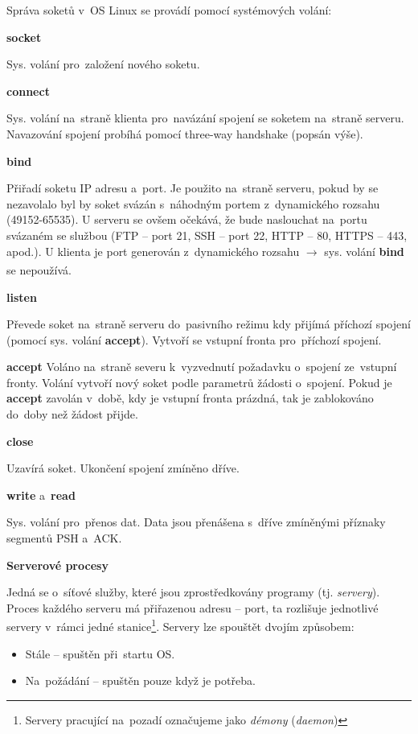 Správa soketů v~OS Linux se provádí pomocí systémových volání:

\vspace{0,5cm}
\textbf{socket}

Sys. volání pro~založení nového soketu.

\vspace{0,5cm}
\textbf{connect}

Sys. volání na~straně klienta pro~navázání spojení se soketem na~straně serveru. Navazování spojení probíhá pomocí three-way handshake (popsán výše).

\vspace{0,5cm}
\textbf{bind}

Přiřadí soketu IP adresu a~port. Je použito na~straně serveru, pokud by se nezavolalo byl by soket svázán s~náhodným portem z~dynamického rozsahu (49152-65535). U serveru se ovšem očekává, že bude naslouchat na~portu svázaném se službou (FTP -- port 21, SSH -- port 22, HTTP -- 80, HTTPS -- 443, apod.). U klienta je port generován z~dynamického rozsahu $\xrightarrow[]{}$ sys. volání \textbf{bind} se nepoužívá. 

\vspace{0,5cm}
\textbf{listen}

Převede soket na~straně serveru do~pasivního režimu kdy přijímá příchozí spojení (pomocí sys. volání \textbf{accept}). Vytvoří se vstupní fronta pro~příchozí spojení. 

\vspace{0,5cm}
\textbf{accept}
Voláno na~straně severu k~vyzvednutí požadavku o~spojení ze~vstupní fronty. Volání vytvoří nový soket podle parametrů žádosti o~spojení. Pokud je \textbf{accept} zavolán v~době, kdy je vstupní fronta prázdná, tak je zablokováno do~doby než žádost přijde.

\vspace{0,5cm}
\textbf{close}

Uzavírá soket. Ukončení spojení zmíněno dříve.

\vspace{0,5cm}
\textbf{write} a~\textbf{read}

Sys. volání pro~přenos dat. Data jsou přenášena s~dříve zmíněnými příznaky segmentů PSH a~ACK.

\clearpage

\begin{Large} 
	\textbf{Serverové procesy}
\end{Large}

Jedná se o~síťové služby, které jsou zprostředkovány programy (tj. \emph{servery}). Proces každého serveru má přiřazenou adresu -- port, ta rozlišuje jednotlivé servery v~rámci jedné stanice\footnote{Servery pracující na~pozadí označujeme jako \emph{démony} (\emph{daemon})}. Servery lze spouštět dvojím způsobem:
\begin{itemize}
	\item Stále -- spuštěn při~startu OS.
	\item Na~požádání -- spuštěn pouze když je potřeba.
\end{itemize}

